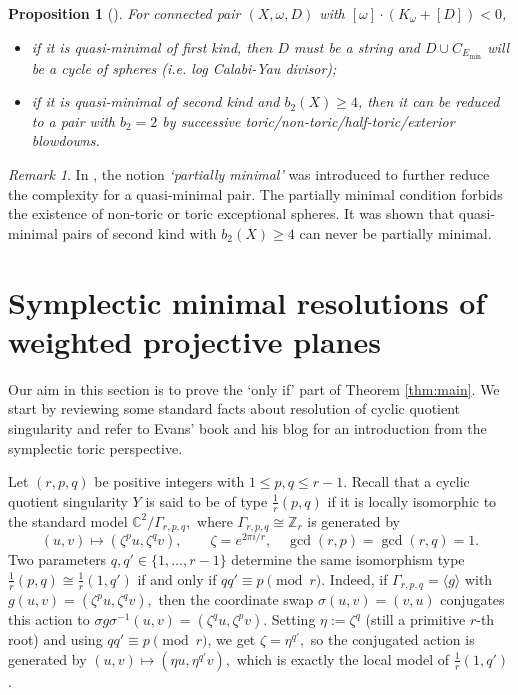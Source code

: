 \documentclass[11pt]{article}
\newtheorem{proposition}[theorem]{Proposition}
\theoremstyle{definition}
\theoremstyle{remark}
\newtheorem{remark}[theorem]{Remark}
\newcommand{\Z}{\mathbb{Z}}
\newcommand{\C}{\mathbb{C}}
\begin{document}
\begin{proposition}[\cite{LN25}]\label{prop:twokinds}
  For connected pair $(X,\omega,D)$ with $[\omega]\cdot(K_\omega+[D])<0$,
  \begin{itemize}[nosep]
    \item if it is quasi-minimal of first kind, then $D$ must be a string and $D\cup C_{E_{\text{min}}}$ will be a cycle of spheres (i.e. log Calabi-Yau divisor);
    \item if it is quasi-minimal of second kind and $b_2(X)\geq 4$, then it can be reduced to a pair with $b_2=2$ by successive toric/non-toric/half-toric/exterior blowdowns.
  \end{itemize}
\end{proposition}

\begin{remark}
  In \cite{LN25}, the notion \emph{`partially minimal'} was introduced to further reduce the complexity for a quasi-minimal pair. The partially minimal condition forbids the existence of non-toric or toric exceptional spheres. It was shown that quasi-minimal pairs of second kind with $b_2(X)\geq 4$ can never be partially minimal.
\end{remark}


\section{Symplectic minimal resolutions of weighted projective planes}\label{section:WP}

Our aim in this section is to prove the `only if' part of Theorem \ref{thm:main}. We start by reviewing some standard facts about resolution of cyclic quotient singularity and refer to Evans' book \cite[Section 4.5]{Evansbook} and his blog \cite{EvansBlog} for an introduction from the symplectic toric perspective.

Let $(r,p,q)$ be positive integers with $1\leq p,q\leq r-1$. Recall that a cyclic quotient singularity $Y$ is said to be of type
\(
  \frac{1}{r}(p,q)
\)
if it is locally isomorphic to the standard model
\(
  \C^{2}/\Gamma_{r,p,q},
\)
where $\Gamma_{r,p,q}\cong\Z_{r}$ is generated by
\[
  (u,v)\longmapsto (\zeta^p u,\zeta^{q}v),\qquad \zeta=e^{2\pi i/r},\quad \gcd(r,p)=\gcd(r,q)=1.
\]
 Two parameters $q,q'\in\{1,\dots,r-1\}$ determine the same isomorphism type $\frac{1}{r}(p,q)\cong\frac{1}{r}(1,q')$ if and only if
\(
  qq'\equiv p\pmod r.
\)
Indeed, if $\Gamma_{r,p,q}=\langle g\rangle$ with
\(
  g(u,v)=(\zeta^p u,\zeta^q v),
\)
then the coordinate swap
\(
  \sigma(u,v)=(v,u)
\)
conjugates this action to
\(
  \sigma g \sigma^{-1}(u,v)=(\zeta^q u,\zeta^p v).
\)
Setting $\eta:=\zeta^q$ (still a primitive $r$-th root) and using $qq'\equiv p\pmod r$, we get
\(
  \zeta=\eta^{q'},
\)
so the conjugated action is generated by
\(
  (u,v)\mapsto(\eta u,\eta^{q'}v),
\)
which is exactly the local model of $\frac{1}{r}(1,q')$. 
\end{document}
